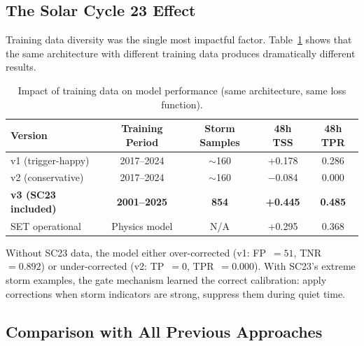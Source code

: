 \documentclass[11pt,a4paper]{article}
\begin{document}
\subsection{The Solar Cycle 23 Effect}

Training data diversity was the single most impactful factor. Table~\ref{tab:versions} shows that the same architecture with different training data produces dramatically different results.

\begin{table}[H]
\centering
\caption{Impact of training data on model performance (same architecture, same loss function).}
\label{tab:versions}
\begin{tabular}{lcccc}
\toprule
\textbf{Version} & \textbf{Training Period} & \textbf{Storm Samples} & \textbf{48h TSS} & \textbf{48h TPR} \\
\midrule
v1 (trigger-happy) & 2017--2024 & $\sim$160 & +0.178 & 0.286 \\
v2 (conservative) & 2017--2024 & $\sim$160 & $-$0.084 & 0.000 \\
\textbf{v3 (SC23 included)} & \textbf{2001--2025} & \textbf{854} & \textbf{+0.445} & \textbf{0.485} \\
SET operational & Physics model & N/A & +0.295 & 0.368 \\
\bottomrule
\end{tabular}
\end{table}

Without SC23 data, the model either over-corrected (v1: FP~$= 51$, TNR~$= 0.892$) or under-corrected (v2: TP~$= 0$, TPR~$= 0.000$). With SC23's extreme storm examples, the gate mechanism learned the correct calibration: apply corrections when storm indicators are strong, suppress them during quiet time.

\subsection{Comparison with All Previous Approaches}
\end{document}
